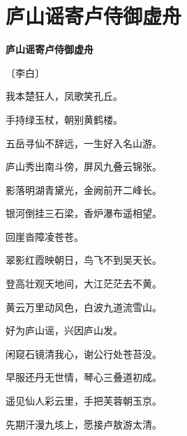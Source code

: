 \documentclass[12pt,UTF-8,openany,fontset=none]{ctexbook}
\begin{document}
\vspace{8pt}
\clearpage

\section{庐山谣寄卢侍御虚舟}


\begin{center}
    {\bfseries 庐山谣寄卢侍御虚舟}

    \vspace{18pt}

    \begin{large}\xuwen
        〔李白〕
    \end{large}

\end{center}

    \vspace{18pt}

\begin{center}
    \begin{Large}

        我本楚狂人，凤歌笑孔丘。

        手持绿玉杖，朝别黄鹤楼。

        五岳寻仙不辞远，一生好入名山游。

        庐山秀出南斗傍，屏风九叠云锦张。

        影落明湖青黛光，金阙前开二峰长。

        银河倒挂三石梁，香炉瀑布遥相望。

        回崖沓障凌苍苍。

        翠影红霞映朝日，鸟飞不到吴天长。

        登高壮观天地间，大江茫茫去不黄。

        黄云万里动风色，白波九道流雪山。

        好为庐山谣，兴因庐山发。

        闲窥石镜清我心，谢公行处苍苔没。

        早服还丹无世情，琴心三叠道初成。

        遥见仙人彩云里，手把芙蓉朝玉京。

        先期汗漫九垓上，愿接卢敖游太清。

    \end{Large}

\end{center}

\vspace{8pt}
\clearpage
\end{document}
